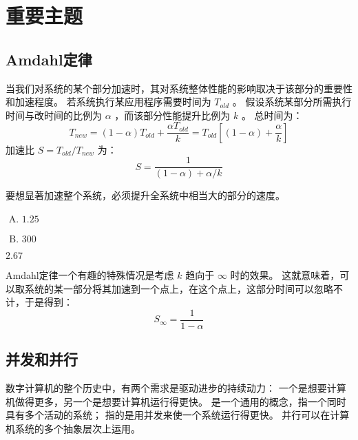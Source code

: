 
\section{重要主题}
{
    \subsection{Amdahl定律}
    {
        \begin{defines}[Amdahl定律]
            当我们对系统的某个部分加速时，其对系统整体性能的影响取决于该部分的重要性和加速程度。
            若系统执行某应用程序需要时间为 $T_{old}$ 。
            假设系统某部分所需执行时间与改时间的比例为 $\alpha$ ，而该部分性能提升比例为 $k$ 。
            总时间为：
            $$T_{new} = (1 - \alpha)T_{old} + \frac{\alpha T_{old}}{k} = T_{old}[(1 - \alpha) + \frac{\alpha}{k}]$$
            加速比 $S = T_{old} / T_{new}$ 为：
            $$S = \frac{1}{(1 - \alpha) + \alpha / k}$$
        \end{defines}

        要想显著加速整个系统，必须提升全系统中相当大的部分的速度。

        \begin{practicec}
            \begin{enumerate}[A.]
                \item $1.25$
                \item $300$
            \end{enumerate}
        \end{practicec}

        \begin{practicec}
            $2.67$
        \end{practicec}

        Amdahl定律一个有趣的特殊情况是考虑 $k$ 趋向于 $\infty$ 时的效果。
        这就意味着，可以取系统的某一部分将其加速到一个点上，在这个点上，这部分时间可以忽略不计，于是得到：
        $$S_\infty = \frac{1}{1 - \alpha}$$
    }

    \subsection{并发和并行}
    {
        数字计算机的整个历史中，有两个需求是驱动进步的持续动力：
        一个是想要计算机做得更多，另一个是想要计算机运行得更快。
        是一个通用的概念，指一个同时具有多个活动的系统；
        指的是用并发来使一个系统运行得更快。
        并行可以在计算机系统的多个抽象层次上运用。

}}
